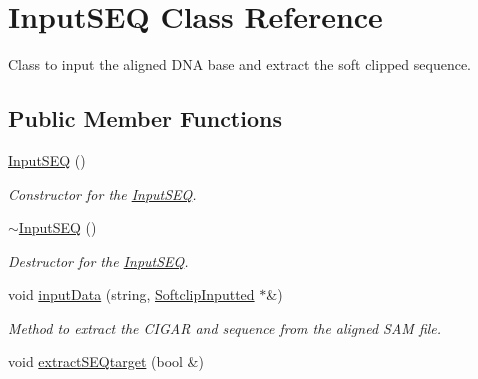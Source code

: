 \hypertarget{class_input_s_e_q}{\section{Input\+S\+E\+Q Class Reference}
\label{class_input_s_e_q}
}


Class to input the aligned D\+N\+A base and extract the soft clipped sequence.  


\subsection*{Public Member Functions}
\begin{DoxyCompactItemize}
\item 
\hypertarget{class_input_s_e_q_a368958fdf80b93eb97d40bd8cd942d53}{\hyperlink{class_input_s_e_q_a368958fdf80b93eb97d40bd8cd942d53}{Input\+S\+E\+Q} ()}\label{class_input_s_e_q_a368958fdf80b93eb97d40bd8cd942d53}

\begin{DoxyCompactList}\small\item\em Constructor for the \hyperlink{class_input_s_e_q}{Input\+S\+E\+Q}. \end{DoxyCompactList}\item 
\hypertarget{class_input_s_e_q_a4816fecf30fc8cb65e1d2cf2f1ed4e12}{\hyperlink{class_input_s_e_q_a4816fecf30fc8cb65e1d2cf2f1ed4e12}{$\sim$\+Input\+S\+E\+Q} ()}\label{class_input_s_e_q_a4816fecf30fc8cb65e1d2cf2f1ed4e12}

\begin{DoxyCompactList}\small\item\em Destructor for the \hyperlink{class_input_s_e_q}{Input\+S\+E\+Q}. \end{DoxyCompactList}\item 
\hypertarget{class_input_s_e_q_a8e5de4382ed1a3ba85ab209f952d1993}{void \hyperlink{class_input_s_e_q_a8e5de4382ed1a3ba85ab209f952d1993}{input\+Data} (string, \hyperlink{struct_softclip_inputted}{Softclip\+Inputted} $\ast$\&)}\label{class_input_s_e_q_a8e5de4382ed1a3ba85ab209f952d1993}

\begin{DoxyCompactList}\small\item\em Method to extract the C\+I\+G\+A\+R and sequence from the aligned S\+A\+M file. \end{DoxyCompactList}\item 
\hypertarget{class_input_s_e_q_a1d157493d3f819c7f8ac4ecab835bfff}{void \hyperlink{class_input_s_e_q_a1d157493d3f819c7f8ac4ecab835bfff}{extract\+S\+E\+Qtarget} (bool \&)}\label{class_input_s_e_q_a1d157493d3f819c7f8ac4ecab835bfff}


\end{DoxyCompactItemize}
